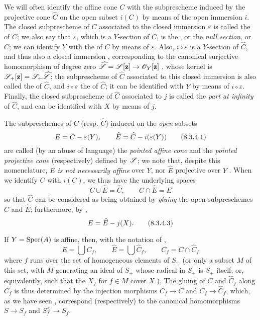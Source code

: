 \begin{env}[8.3.3]
\label{II.8.3.3}
We will often identify the affine cone $C$ with the subprescheme induced by the projective cone $\widehat{C}$ on the open subset $i(C)$ by means of the open immersion $i$.
The closed subprescheme of $C$ associated to the closed immersion $\varepsilon$ is called the  of $C$;
we also say that $\varepsilon$, which is a $Y$-section of $C$, is the , or the \emph{null section},  or $C$;
we can identify $Y$ with the  of $C$ by means of $\varepsilon$.
Also, $i\circ\varepsilon$ is a $Y$-section of $\widehat{C}$, and thus also a closed immersion , corresponding to the canonical surjective homomorphism of degree zero $\widehat{\sh{S}} = \sh{S}[\bb{z}] \to \sh{O}_Y[\bb{z}]$ , whose kernel is $\mathscr{S}_+[\mathbf{z}] = \mathscr{S}_+\widehat{\mathscr{S}}$;
the subprescheme of $\widehat{C}$ associated to this closed immersion is also called the  of $\widehat{C}$, and $i\circ\varepsilon$ the  of $\widehat{C}$;
it can be identified with $Y$ by means of $i\circ\varepsilon$.
Finally, the closed subprescheme of $\widehat{C}$ associated to $j$ is called the \emph{part at infinity} of $\widehat{C}$, and can be identified with $X$ by means of $j$.
\end{env}

\begin{env}[8.3.4]
\label{II.8.3.4}
The subpreschemes of $C$ (resp. $\widehat{C}$) induced on the \emph{open} subsets
\[
\label{II.8.3.4.1}
  E = C - \varepsilon(Y),
  \qquad
  \widehat{E} = \widehat{C} - i(\varepsilon(Y))
\tag{8.3.4.1}
\]
are called (by an abuse of language) the \emph{pointed affine cone} and the \emph{pointed projective cone} (respectively) defined by $\mathscr{S}$;
we note that, despite this nomenclature, \emph{$E$ is not necessarily affine} over $Y$, nor $\widehat{E}$ projective over $Y$ .
When we identify $C$ with $i(C)$, we thus have the underlying spaces
\[
\label{II.8.3.4.2}
  C \cup \widehat{E} = \widehat{C},
  \qquad
  C \cap \widehat{E} = E
\tag{8.3.4.2}
\]
so that $\widehat{C}$ can be considered as being obtained by \emph{gluing} the open subpreschemes $C$ and $\widehat{E}$;
furthermore, by ,
\[
\label{II.8.3.4.3}
  E = \widehat{E} - j(X).
\tag{8.3.4.3}
\]

If $Y=\operatorname{Spec}(A)$ is affine, then, with the notation of ,
\[
\label{II.8.3.4.4}
  E = \bigcup C_f,
  \qquad
  \widehat{E} = \bigcup \widehat{C}_f,
  \qquad
  C_f = C \cap \widehat{C}_f
\tag{8.3.4.4}
\]
where $f$ runs over the set of homogeneous elements of $S_+$ (or only a subset $M$ of this set, with $M$ generating an ideal of $S_+$ whose radical in $S_+$ is $S_+$ itself, or, equivalently, such that the $X_f$ for $f\in M$ cover $X$ ).
The gluing of $C$ and $\widehat{C}_f$ along $C_f$ is thus determined by the injection morphisms $C_f\to C$ and $C_f\to\widehat{C}_f$, which, as we have seen , correspond (respectively) to the canonical homomorphisms $S\to S_f$ and $S_f^\leq\to S_f$.
\end{env}

